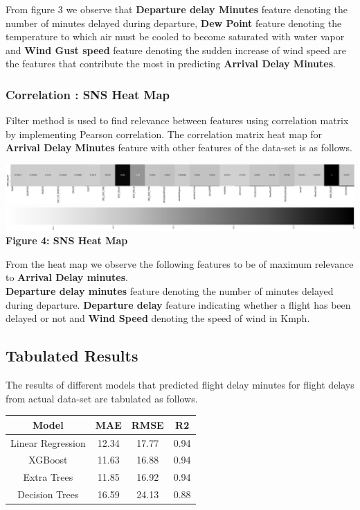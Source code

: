 \documentclass{article}
\begin{document}
From figure 3 we observe that \textbf{Departure delay Minutes} feature denoting the number of minutes delayed during departure, \textbf{Dew Point} feature denoting the temperature to which air must be cooled to become saturated with water vapor and \textbf{Wind Gust speed} feature denoting the sudden increase of wind speed are the features that contribute the most in predicting \textbf{Arrival Delay Minutes}.

\clearpage

\subsubsection{Correlation : SNS Heat Map}

Filter method is used to find relevance between features using correlation matrix by implementing Pearson correlation. The correlation matrix heat map for \textbf{Arrival Delay Minutes} feature with other features of the data-set is as follows.

\begin{center}
  \includegraphics[width=1\textwidth]{final.jpg}
   \includegraphics[width=1\textwidth]{3.png}
  \bigbreak
  \textbf{Figure 4: SNS Heat Map}
\end{center}

From the heat map we observe the following features to be of maximum relevance to \textbf{Arrival Delay minutes}. \\

\textbf{Departure delay minutes} feature denoting the number of minutes delayed during departure. \textbf{Departure delay} feature indicating whether a flight has been delayed or not and \textbf{Wind Speed} denoting the speed of wind in Kmph.

\subsection{Tabulated Results}


The results of different models that predicted flight delay minutes for flight delays from actual data-set are tabulated as follows. 
\begin{center}
 \label{tab:title} 
\begin{tabular}{ |c|c|c|c| } 
 \hline
 \textbf{Model} & \textbf{MAE} & \textbf{RMSE} & \textbf{R2} \\
 \hline
 Linear Regression & 12.34 & 17.77 & 0.94 \\ 
 \hline
 XGBoost & 11.63 & 16.88 & 0.94 \\
 \hline
 Extra Trees & 11.85 & 16.92 & 0.94 \\
 \hline
 Decision Trees & 16.59 & 24.13 & 0.88 \\
 \hline
\end{tabular}
\end{center}
\bigbreak
\end{document}
